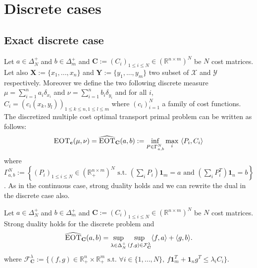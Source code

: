 \section{Discrete cases}
\subsection{Exact discrete case}
\label{dis:exact}

Let $a\in\Delta_N^{+}$ and $b\in\Delta^+_m$ and $\mathbf{C}:=(C_i)_{1\leq i\leq N}\in\left(\mathbb{R}^{n\times m}\right)^N$ be $N$ cost matrices. Let also $\mathbf{X}:=\{x_1,...,x_n\}$ and $\mathbf{Y}:=\{y_1,...,y_m\}$ two subset of $\mathcal{X}$ and $\mathcal{Y}$ respectively. Moreover we define the two following discrete measure $\mu=\sum_{i=1}^n a_i \delta_{x_i}$ and $\nu=\sum_{i=1}^n b_i \delta_{y_i}$ and for all $i$, $C_i = (c_i(x_k,y_l))_{1\leq k\leq n,1\leq l\leq m}$ where $(c_i)_{i=1}^N$ a family of cost functions. The discretized multiple cost optimal transport primal problem can be written as follows:
\begin{align*}
\textsc{EOT}_{\mathbf{c}}(\mu,\nu)=\widehat{\textsc{EOT}}_{\textbf{C}}(a,b) := \inf_{P\in\Gamma_{a,b}^N} \max_i~\langle P_i,C_i\rangle
\end{align*}
where $\Gamma_{a,b}^N:=\left\{(P_i)_{1\leq i\leq N}\in\left(\mathbb{R}_+^{n\times m}\right)^N\text{ s.t. } (\sum_i P_i)\mathbf{1}_m=a \text{ and } (\sum_i P_i^T)\mathbf{1}_n=b \right\}$. 
As in the continuous case, strong duality holds and we can rewrite the dual in the discrete case also.
\begin{prop}
\label{prop:discrete-dual}

Let $a\in\Delta_N^{+}$ and $b\in\Delta^+_m$ and $\mathbf{C}:=(C_i)_{1\leq i\leq N}\in\left(\mathbb{R}^{n\times m}\right)^N$ be $N$ cost matrices. Strong duality holds for the discrete problem and
\begin{align*}
\widehat{\textsc{EOT}}_{\mathbf{C}}(a,b)=\sup_{\lambda\in\Delta^+_N}\sup\limits_{(f,g)\in\mathcal{F}^{\lambda}_{\mathbf{C}}} \langle f,a\rangle+\langle g,b\rangle.
\end{align*}
where $\mathcal{F}^{\lambda}_{\mathbf{C}}:=\{(f,g)\in\mathbb{R}_{+}^n\times\mathbb{R}_{+}^m\text{ s.t. }\forall i\in\{1,...,N\},~ f\mathbf{1}_m^T+\mathbf{1}_n g^T\leq\lambda_i C_i\}$.
\end{prop}




